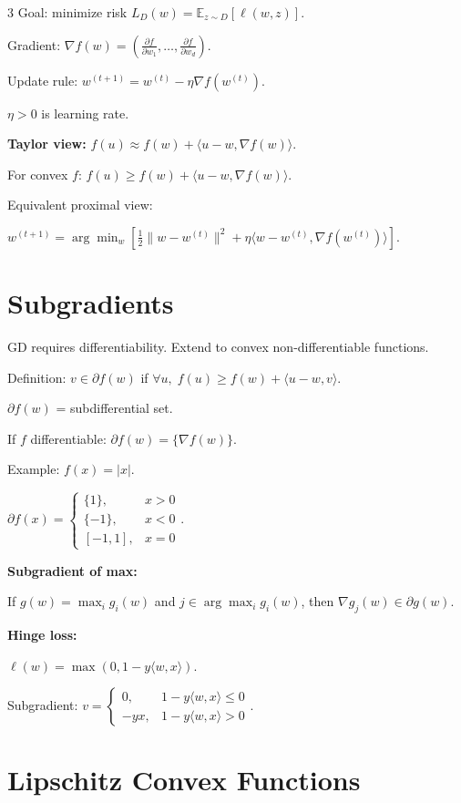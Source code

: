 \documentclass[8pt,fleqn]{extarticle}
\begin{document}
\begin{multicols}{3}
Goal: minimize risk $L_D(w)=\mathbb E_{z\sim D}[\ell(w,z)]$.

Gradient:
$\nabla f(w)=\left(\frac{\partial f}{\partial w_1},\dots,\frac{\partial f}{\partial w_d}\right)$.

Update rule:
$w^{(t+1)}=w^{(t)}-\eta\nabla f(w^{(t)})$.

$\eta>0$ is learning rate.

\textbf{Taylor view:}
$f(u)\approx f(w)+\langle u-w,\nabla f(w)\rangle$.

For convex $f$:
$f(u)\ge f(w)+\langle u-w,\nabla f(w)\rangle$.

Equivalent proximal view:

$w^{(t+1)}=
\arg\min_w
\left[\frac12\|w-w^{(t)}\|^2
+\eta\langle w-w^{(t)},\nabla f(w^{(t)})\rangle\right]$.


\section*{Subgradients}

GD requires differentiability.
Extend to convex non-differentiable functions.

Definition:
$v\in\partial f(w)$ if
$\forall u,\;
f(u)\ge f(w)+\langle u-w,v\rangle$.

$\partial f(w)$ = subdifferential set.

If $f$ differentiable:
$\partial f(w)=\{\nabla f(w)\}$.

Example:
$f(x)=|x|$.

$\partial f(x)=
\begin{cases}
\{1\}, & x>0 \\
\{-1\}, & x<0 \\
[-1,1], & x=0
\end{cases}$.

\textbf{Subgradient of max:}

If $g(w)=\max_i g_i(w)$ and $j\in\arg\max_i g_i(w)$,
then $\nabla g_j(w)\in\partial g(w)$.

\textbf{Hinge loss:}

$\ell(w)=\max(0,1-y\langle w,x\rangle)$.

Subgradient:
$v=
\begin{cases}
0, & 1-y\langle w,x\rangle\le0 \\
-yx, & 1-y\langle w,x\rangle>0
\end{cases}$.


\section*{Lipschitz Convex Functions}


\end{multicols}
\end{document}
